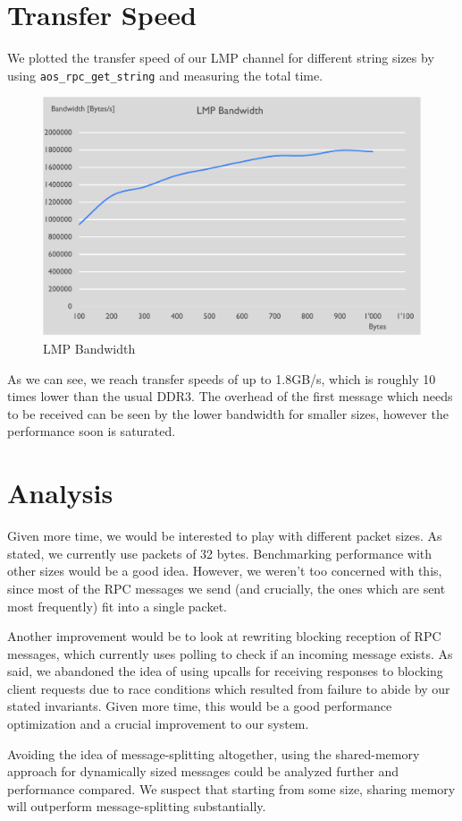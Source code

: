 \section{Transfer Speed}
We plotted the transfer speed of our LMP channel for different string sizes by using \texttt{aos\_rpc\_get\_string}
and measuring the total time.
\begin{figure}
    \centering
    \includegraphics[scale=0.7]{lmp_bandwidth.png}
    \caption{LMP Bandwidth}
    \label{fig:my_label}
\end{figure}
As we can see, we reach transfer speeds of up to 1.8GB/s, which is roughly 10 times lower than the usual DDR3. The overhead of the first message which needs to be received can be seen by the lower bandwidth for smaller sizes, however the performance soon is saturated.

\section{Analysis} %
Given more time, we would be interested to play with different packet sizes. As stated,
we currently use packets of 32 bytes. Benchmarking performance with other sizes 
would be a good idea. However, we weren't too concerned with this, since most of the RPC
messages we send (and crucially, the ones which are sent most frequently) fit into a single packet.

Another improvement would be to look at rewriting blocking reception of RPC messages,
which currently uses polling to check if an incoming message exists. As said, we 
abandoned the idea of using upcalls for receiving responses to blocking client requests due to race conditions 
which resulted from failure to abide by our stated invariants. Given more time, 
this would be a good performance optimization and a crucial improvement to our system.

Avoiding the idea of message-splitting altogether, 
using the shared-memory approach for dynamically sized messages could be 
analyzed further and performance compared. We suspect that starting from some size, 
sharing memory will outperform message-splitting substantially.


